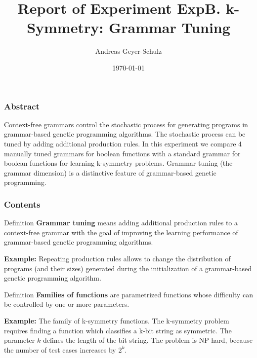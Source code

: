 \documentclass[18pt,c]{beamer}
\begin{document}
\title{Report of Experiment ExpB. k-Symmetry: Grammar Tuning}
\author{Andreas Geyer-Schulz}
\date{\today}
\begin{frame}
\titlepage
\end{frame}
\begin{frame}
\frametitle{Abstract}
Context-free grammars control the stochastic process for generating programs in grammar-based genetic programming algorithms. The stochastic process can be tuned by adding additional production rules. In this experiment we compare 4 manually tuned grammars for boolean functions with a standard grammar for boolean functions for learning k-symmetry problems. Grammar tuning (the grammar dimension) is a distinctive feature of grammar-based genetic programming.%
\end{frame}
\begin{frame}[t, allowframebreaks]
\frametitle{Contents}
\tableofcontents[subsubsectionstyle=hide]
\vfill
\end{frame}
\begin{frame}
\vspace*{2mm}
\begin{block}{
Definition
}
{\bf Grammar tuning} means adding additional production rules
to a context-free grammar with the goal of improving the learning
performance of grammar-based genetic programming algorithms.
 
{\bf Example:} Repeating production rules allows to change the distribution
of programs (and their sizes) generated during the initialization of a grammar-based
genetic programming algorithm.
\end{block}
\end{frame}%
\begin{frame}
\vspace*{2mm}
\begin{block}{
Definition
}
{\bf Families of functions} are parametrized functions whose difficulty
can be controlled by one or more parameters.
 
{\bf Example:} The family of k-symmetry functions.
The k-symmetry problem requires finding a function which classifies
a k-bit string as symmetric.
The parameter $k$ defines the length of the bit string.
The problem is NP hard, because the number of test cases increases by $2^k$.
\end{block}
\end{frame}%
\end{document}
